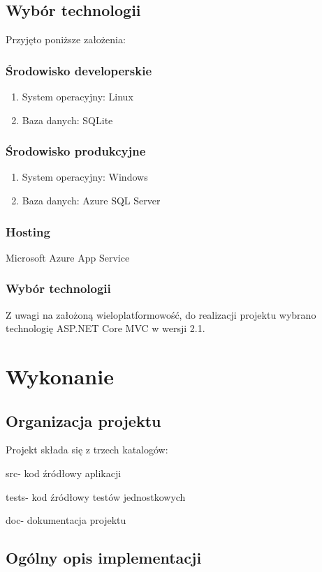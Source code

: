 \documentclass[a4paper,10pt]{article}
\begin{document}
\subsection{Wybór technologii}
Przyjęto poniższe założenia:
\subsubsection{Środowisko developerskie}
\begin{enumerate}
 \item System operacyjny: Linux
 \item Baza danych: SQLite
\end{enumerate}

\subsubsection{Środowisko produkcyjne}
\begin{enumerate}
 \item System operacyjny: Windows 
 \item Baza danych: Azure SQL Server
\end{enumerate}

\subsubsection{Hosting}
Microsoft Azure App Service
\subsubsection{Wybór technologii}
Z uwagi na założoną wieloplatformowość, do realizacji projektu wybrano technologię ASP.NET Core MVC w wersji 2.1.

\section{Wykonanie}
\subsection{Organizacja projektu}
Projekt składa się z trzech katalogów:
\begin{description}
 \item src- kod źródłowy aplikacji
 \item tests- kod źródłowy testów jednostkowych
 \item doc- dokumentacja projektu
\end{description}
\subsection{Ogólny opis implementacji}
\end{document}
